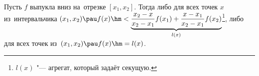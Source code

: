 
    Пусть $f$ выпукла вниз на~отрезке $[x_1,x_2]$. Тогда либо для всех точек $x$ из~интервальчика $(x_1,x_2)\pau f(x)\hm<\underbrace{\dfrac{x_2-x}{x_2-x_1}f(x_1)+\dfrac{x-x_1}{x_2-x_1}f(x_2)}_{l(x)}$\footnote{$l(x)$ "--- агрегат,
    который задаёт секущую.}, либо для всех точек из~$(x_1,x_2)\pau f(x)\hm=l(x)$.
